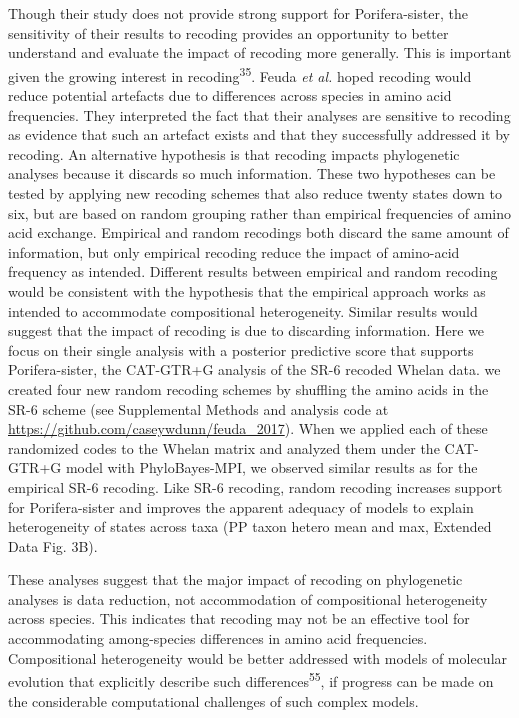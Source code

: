 \documentclass[]{article}
\begin{document}
Though their study does not provide strong support for Porifera-sister,
the sensitivity of their results to recoding provides an opportunity to
better understand and evaluate the impact of recoding more generally.
This is important given the growing interest in
recoding\textsuperscript{35}. Feuda \emph{et al.} hoped recoding would
reduce potential artefacts due to differences across species in amino
acid frequencies. They interpreted the fact that their analyses are
sensitive to recoding as evidence that such an artefact exists and that
they successfully addressed it by recoding. An alternative hypothesis is
that recoding impacts phylogenetic analyses because it discards so much
information. These two hypotheses can be tested by applying new recoding
schemes that also reduce twenty states down to six, but are based on
random grouping rather than empirical frequencies of amino acid
exchange. Empirical and random recodings both discard the same amount of
information, but only empirical recoding reduce the impact of amino-acid
frequency as intended. Different results between empirical and random
recoding would be consistent with the hypothesis that the empirical
approach works as intended to accommodate compositional heterogeneity.
Similar results would suggest that the impact of recoding is due to
discarding information. Here we focus on their single analysis with a
posterior predictive score that supports Porifera-sister, the CAT-GTR+G
analysis of the SR-6 recoded Whelan data. we created four new random
recoding schemes by shuffling the amino acids in the SR-6 scheme (see
Supplemental Methods and analysis code at
\url{https://github.com/caseywdunn/feuda_2017}). When we applied each of
these randomized codes to the Whelan matrix and analyzed them under the
CAT-GTR+G model with PhyloBayes-MPI, we observed similar results as for
the empirical SR-6 recoding. Like SR-6 recoding, random recoding
increases support for Porifera-sister and improves the apparent adequacy
of models to explain heterogeneity of states across taxa (PP taxon
hetero mean and max, Extended Data Fig. 3B).

These analyses suggest that the major impact of recoding on phylogenetic
analyses is data reduction, not accommodation of compositional
heterogeneity across species. This indicates that recoding may not be an
effective tool for accommodating among-species differences in amino acid
frequencies. Compositional heterogeneity would be better addressed with
models of molecular evolution that explicitly describe such
differences\textsuperscript{55}, if progress can be made on the
considerable computational challenges of such complex models.
\end{document}
